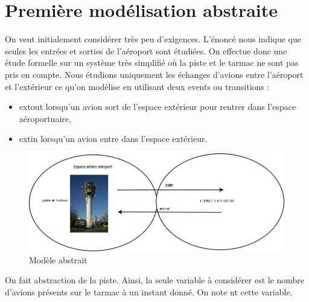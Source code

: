 \section{Première modélisation abstraite}
	

   On veut initialement considérer très peu d'exigences. L'énoncé nous indique
   que seules les entrées et sorties de l'aéroport sont étudiées. On effectue donc une étude formelle sur un système très simplifié où la piste et le tarmac ne sont pas pris en compte. Nous étudions uniquement les échanges d'avions entre l'aéroport et l'extérieur ce qu'on modélise en utilisant deux events ou transitions :
   
   \begin{itemize}
   	\item extout lorsqu'un avion sort de l'espace extérieur pour rentrer dans l'espace aéroportuaire,
   	\item extin lorsqu'un avion entre dans l'espace extérieur.
   \end{itemize} 

\begin{figure}[H]
	\begin{center}	
		\includegraphics[scale=0.4]{images/mod0}
		\caption{Modèle abstrait}
		\label{mod0}
	\end{center}
\end{figure}

On fait abstraction de la piste. Ainsi, la seule variable à considérer est le nombre d'avions présents sur le tarmac à un instant donné. On note nt cette variable.

